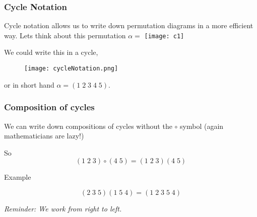 \documentclass{beamer}
\begin{document}





\begin{frame}
  \frametitle{Cycle Notation}
Cycle notation allows us to write down permutation diagrams in a more efficient way.
Lets think about this permutation $\alpha = $ \texttt{[image: c1]}

We could write this in a cycle, 

\begin{figure}[h]
  \centering
  \texttt{[image: cycleNotation.png]}
\end{figure}

or in short hand $\alpha = (1 \; 2 \; 3 \; 4 \; 5)$.




  
\end{frame}

\begin{frame}
  \frametitle{Composition of cycles}
We can write down compositions of cycles without the $\circ$ symbol (again mathematicians are lazy!)

So
\begin{equation*}
   (1 \; 2 \; 3) \circ (4 \; 5) = (1 \; 2 \; 3)(4 \; 5)
\end{equation*}

Example

\begin{equation*}
  (2 \; 3 \; 5)(1 \; 5 \; 4) = (1 \; 2 \; 3 \; 5 \; 4)
\end{equation*}


\textit{Reminder: We work from right to left.}
\end{frame}
\end{document}
